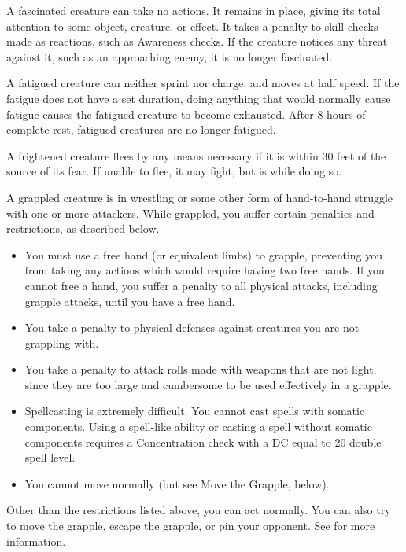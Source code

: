  A fascinated creature can take no actions. It remains in place, giving its total attention to some object, creature, or effect. It takes a  penalty to skill checks made as reactions, such as Awareness checks. If the creature notices any threat against it, such as an approaching enemy, it is no longer fascinated.

 A fatigued creature can neither sprint nor charge, and moves at half speed. If the fatigue does not have a set duration, doing anything that would normally cause fatigue causes the fatigued creature to become exhausted. After 8 hours of complete rest, fatigued creatures are no longer fatigued.

 A frightened creature flees by any means necessary if it is within 30 feet of the source of its fear. If unable to flee, it may fight, but is \severelyimpaired while doing so.

 A grappled creature is in wrestling or some other form of hand-to-hand struggle with one or more attackers. While grappled, you suffer certain penalties and restrictions, as described below.

\begin{itemize}
    \item You must use a free hand (or equivalent limbs) to grapple, preventing you from taking any actions which would require having two free hands. If you cannot free a hand, you suffer a  penalty to all physical attacks, including grapple attacks, until you have a free hand.
    \item You take a  penalty to physical defenses against creatures you are not grappling with.
    \item You take a  penalty to attack rolls made with weapons that are not light, since they are too large and cumbersome to be used effectively in a grapple.
    \item Spellcasting is extremely difficult. You cannot cast spells with somatic components. Using a spell-like ability or casting a spell without somatic components requires a Concentration check with a DC equal to 20 \add double spell level.
    \item You cannot move normally (but see Move the Grapple, below).
\end{itemize}

Other than the restrictions listed above, you can act normally. You can also try to move the grapple, escape the grapple, or pin your opponent. See  for more information.

